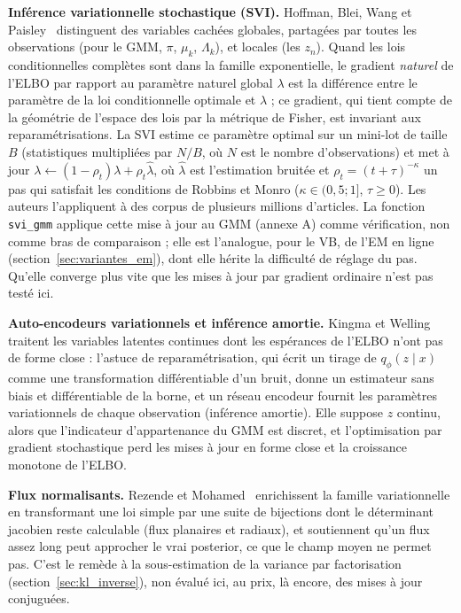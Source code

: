 \textbf{Inférence variationnelle stochastique (SVI). }Hoffman, Blei, Wang et Paisley~\cite{hoffman2013} distinguent des variables cachées globales, partagées par toutes les observations (pour le GMM, $\pi$, $\mu_k$, $\Lambda_k$), et locales (les $z_n$). Quand les lois conditionnelles complètes sont dans la famille exponentielle, le gradient \emph{naturel} de l'ELBO par rapport au paramètre naturel global $\lambda$ est la différence entre le paramètre de la loi conditionnelle optimale et $\lambda$ ; ce gradient, qui tient compte de la géométrie de l'espace des lois par la métrique de Fisher, est invariant aux reparamétrisations. La SVI estime ce paramètre optimal sur un mini-lot de taille $B$ (statistiques multipliées par $N/B$, où $N$ est le nombre d'observations) et met à jour $\lambda \leftarrow (1 - \rho_t)\lambda + \rho_t \hat\lambda$, où $\hat\lambda$ est l'estimation bruitée et $\rho_t = (t + \tau)^{-\kappa}$ un pas qui satisfait les conditions de Robbins et Monro ($\kappa \in (0{,}5 ; 1]$, $\tau \geq 0$). Les auteurs l'appliquent à des corpus de plusieurs millions d'articles. La fonction \texttt{svi\_gmm} applique cette mise à jour au GMM (annexe A) comme vérification, non comme bras de comparaison ; elle est l'analogue, pour le VB, de l'EM en ligne (section~\ref{sec:variantes_em}), dont elle hérite la difficulté de réglage du pas. Qu'elle converge plus vite que les mises à jour par gradient ordinaire n'est pas testé ici.

\textbf{Auto-encodeurs variationnels et inférence amortie. }Kingma et Welling~\cite{kingma2014} traitent les variables latentes continues dont les espérances de l'ELBO n'ont pas de forme close : l'astuce de reparamétrisation, qui écrit un tirage de $q_\phi(z \mid x)$ comme une transformation différentiable d'un bruit, donne un estimateur sans biais et différentiable de la borne, et un réseau encodeur fournit les paramètres variationnels de chaque observation (inférence amortie). Elle suppose $z$ continu, alors que l'indicateur d'appartenance du GMM est discret, et l'optimisation par gradient stochastique perd les mises à jour en forme close et la croissance monotone de l'ELBO.

\textbf{Flux normalisants. }Rezende et Mohamed~\cite{rezende2015} enrichissent la famille variationnelle en transformant une loi simple par une suite de bijections dont le déterminant jacobien reste calculable (flux planaires et radiaux), et soutiennent qu'un flux assez long peut approcher le vrai posterior, ce que le champ moyen ne permet pas. C'est le remède à la sous-estimation de la variance par factorisation (section~\ref{sec:kl_inverse}), non évalué ici, au prix, là encore, des mises à jour conjuguées.

